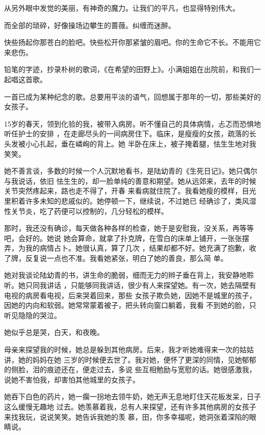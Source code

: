 \documentclass[12pt,a4paper]{article}
\begin{document}
		从另外眼中发觉的美丽，有神奇的魔力。让我们的平凡，也显得特别伟大。

		而全部的琐碎，好像操场边攀生的蔷薇。纠缠而迷醉。

	\endwriting



		快些扬起你那苍白的脸吧。快些松开你那紧皱的眉吧。你的生命它不长。不能用它来悲伤。

		铅笔的字迹，抄录朴树的歌词，《在希望的田野上》。小满姐姐在出院前，和我们一起唱这首歌。

		一首已成为某种纪念的歌。总要用平淡的语气，回想属于那年的一切，那些美好的女孩子。


		15岁的春天，领到化验的我，被带入病房。听不懂自己的具体病情，忐忑而恐惧地听任护士的安排
	，在走廊尽头的一间病房住下。临床，是瘦瘦的女孩，疏落的长头发被小心扎起，垂在嶙峋的背上。她
	半卧在床上，被子掩着腿，怯生生地对我笑笑。


		她不善言谈，多数的时候一个人沉默地看书，是陆幼青的《生死日记》。她只偶尔与我说话，依旧
	怯生生的，却一脸单纯的善意和期望。她从远郊来，去年的时候关节突然疼起来，路也走不得了，开春
	来看病就住院了。我看她瘦的模样，目光里积着许多未知的悲戚似的。她停顿一下，继续说，不过她已
	经确诊了，类风湿性关节炎，吃了药便可以控制的，几分轻松的模样。


		那时，我还没有确诊，每天做各种各样的检查，她于是安慰我，没关系，再等等吧，会好的。她说
	她会算命，就拿了扑克牌，在雪白的床单上铺开，一张张摆弄，为我的病情占卜。她很认真，算了几次
	，结果却都不好。她充满了抱歉，收了牌，反复说一点也不准。我看她紧张，明白了她的善良，那么简
	单。


		她对我谈论陆幼青的书，讲生命的脆弱，细而无力的辫子垂在背上，我安静地聆听。她只同我讲话
	，只能够同我讲话，很少有人来探望她。有一次，她去隔壁有电视的病房看电视，后来哭着回来，那些
	女孩子欺负她，因她不是城里的孩子，因她的内向和软弱。她常常蒙着被子，把头转向窗口躺着，我看
	不到她的脸，只听见隐隐的哭泣。


		她似乎总是哭，白天，和夜晚。


		母亲来探望我的时候，她总是躲到其他病房。后来，我才听她难得来一次的姑姑讲，她的妈妈在她
	三岁的时候便去世了。我对她，便怀了更深的同情，见她郁郁的侧脸，泪的痕迹还在，便走过去，多说
	些互相勉励与宽慰的话。她很感激我，说她不害怕我，却害怕其他城里的女孩子。


		她吞下白色的药片，她一瘸一拐地去领牛奶，她无声无息地盯住天花板发呆，日子这么缓慢无趣地
	过去。她羡慕着我，总有人来探望，还有许多其他病房的女孩子来找我玩，说说笑笑。她告诉我她的羡
	慕，田，你多幸福呢，她洞张着深陷的眼睛说。
\end{document}
